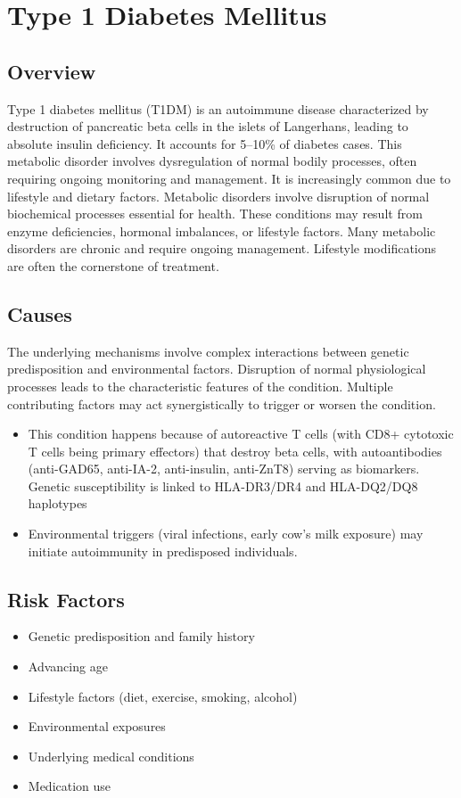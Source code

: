\chapter{Type 1 Diabetes Mellitus}
\label{sec:Type 1 Diabetes Mellitus}

\section{Overview}
Type 1 diabetes mellitus (T1DM) is an autoimmune disease characterized by destruction of pancreatic beta cells in the islets of Langerhans, leading to absolute insulin deficiency. It accounts for 5--10\% of diabetes cases. This metabolic disorder involves dysregulation of normal bodily processes, often requiring ongoing monitoring and management. It is increasingly common due to lifestyle and dietary factors. Metabolic disorders involve disruption of normal biochemical processes essential for health. These conditions may result from enzyme deficiencies, hormonal imbalances, or lifestyle factors. Many metabolic disorders are chronic and require ongoing management. Lifestyle modifications are often the cornerstone of treatment.
\section{Causes}
The underlying mechanisms involve complex interactions between genetic predisposition and environmental factors. Disruption of normal physiological processes leads to the characteristic features of the condition. Multiple contributing factors may act synergistically to trigger or worsen the condition.

\begin{itemize}[noitemsep]
  \item This condition happens because of autoreactive T cells (with CD8+ cytotoxic T cells being primary effectors) that destroy beta cells, with autoantibodies (anti-GAD65, anti-IA-2, anti-insulin, anti-ZnT8) serving as biomarkers. Genetic susceptibility is linked to HLA-DR3/DR4 and HLA-DQ2/DQ8 haplotypes
  \item Environmental triggers (viral infections, early cow's milk exposure) may initiate autoimmunity in predisposed individuals.
\end{itemize}
\section{Risk Factors}
\begin{itemize}[noitemsep]
  \item Genetic predisposition and family history
  \item Advancing age
  \item Lifestyle factors (diet, exercise, smoking, alcohol)
  \item Environmental exposures
  \item Underlying medical conditions
  \item Medication use
\end{itemize}

